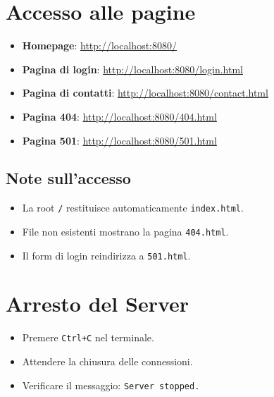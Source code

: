\documentclass[a4paper,12pt]{report}
\begin{document}
\section{Accesso alle pagine}

\begin{itemize}
    \item \textbf{Homepage}: \url{http://localhost:8080/}
    \item \textbf{Pagina di login}: \url{http://localhost:8080/login.html}
    \item \textbf{Pagina di contatti}: \url{http://localhost:8080/contact.html}
    \item \textbf{Pagina 404}: \url{http://localhost:8080/404.html}
    \item \textbf{Pagina 501}: \url{http://localhost:8080/501.html}
\end{itemize}

\subsection{Note sull'accesso}

\begin{itemize}
    \item La root \texttt{/} restituisce automaticamente \texttt{index.html}.
    \item File non esistenti mostrano la pagina \texttt{404.html}.
    \item Il form di login reindirizza a \texttt{501.html}.
\end{itemize}

\section{Arresto del Server}

\begin{itemize}
    \item Premere \texttt{Ctrl+C} nel terminale.
    \item Attendere la chiusura delle connessioni.
    \item Verificare il messaggio: \texttt{Server stopped.}
\end{itemize}
\end{document}
